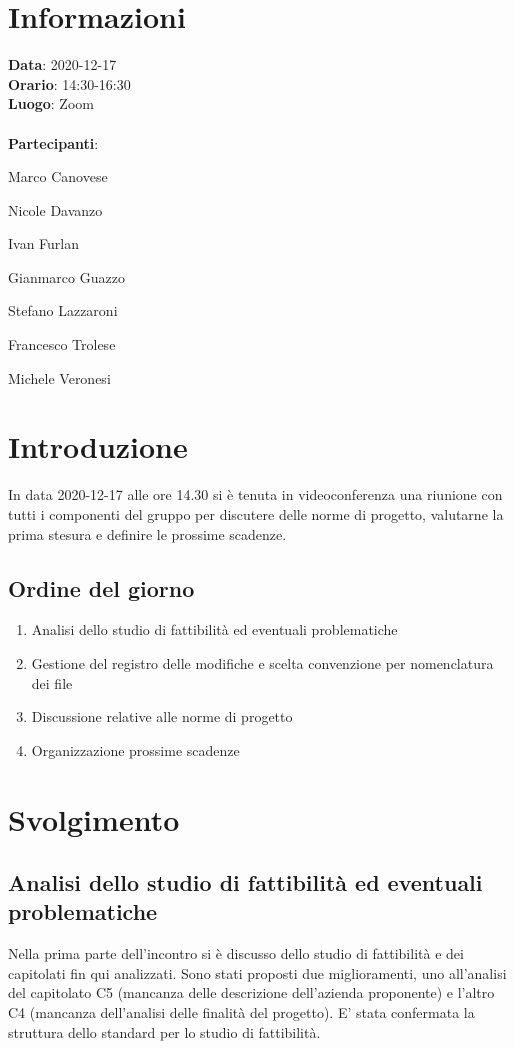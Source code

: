 \section{Informazioni}
\textbf{Data}: 2020-12-17\\
\textbf{Orario}: 14:30-16:30\\
\textbf{Luogo}: Zoom\\\\
\textbf{Partecipanti}:\begin{list}{*}{\setlength{\itemsep}{0cm}}
	\item Marco Canovese
	\item Nicole Davanzo
	\item Ivan Furlan
	\item Gianmarco Guazzo
	\item Stefano Lazzaroni
	\item Francesco Trolese
	\item Michele Veronesi
\end{list}

\section{Introduzione}
In data 2020-12-17 alle ore 14.30 si è tenuta in videoconferenza una riunione con tutti i componenti del gruppo per discutere delle norme di progetto, valutarne la prima stesura e definire le prossime scadenze.
\subsection{Ordine del giorno}
\begin{enumerate}
    \item Analisi dello studio di fattibilità ed eventuali problematiche
    \item Gestione del registro delle modifiche e scelta convenzione per nomenclatura dei file
    \item Discussione relative alle norme di progetto
    \item Organizzazione prossime scadenze 
\end{enumerate}

\section{Svolgimento}
\subsection{Analisi dello studio di fattibilità ed eventuali problematiche}
Nella prima parte dell'incontro si è discusso dello studio di fattibilità e dei capitolati fin qui analizzati. Sono stati proposti due miglioramenti, uno all'analisi del capitolato C5 (mancanza delle descrizione dell'azienda proponente) e l'altro C4 (mancanza dell'analisi delle finalità del progetto). E' stata confermata la struttura dello standard per lo studio di fattibilità. 

